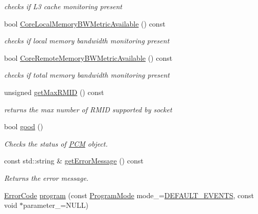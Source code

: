 \begin{DoxyCompactItemize}
\begin{DoxyCompactList}\small\item\em checks if L3 cache monitoring present \end{DoxyCompactList}\item 
bool \mbox{\hyperlink{class_p_c_m_af0648834f063a6bd2ea88c61a2ba286d}{Core\+Local\+Memory\+B\+W\+Metric\+Available}} () const
\begin{DoxyCompactList}\small\item\em checks if local memory bandwidth monitoring present \end{DoxyCompactList}\item 
bool \mbox{\hyperlink{class_p_c_m_a9b2b73d2af7c5a851e5c43df37d7fdb2}{Core\+Remote\+Memory\+B\+W\+Metric\+Available}} () const
\begin{DoxyCompactList}\small\item\em checks if total memory bandwidth monitoring present \end{DoxyCompactList}\item 
unsigned \mbox{\hyperlink{class_p_c_m_a0e1151b2a215849ab67ab2b0056e0e0f}{get\+Max\+R\+M\+ID}} () const
\begin{DoxyCompactList}\small\item\em returns the max number of R\+M\+ID supported by socket \end{DoxyCompactList}\item 
bool \mbox{\hyperlink{class_p_c_m_a56eedaa84893f72b1723f8d580ee3329}{good}} ()
\begin{DoxyCompactList}\small\item\em Checks the status of \mbox{\hyperlink{class_p_c_m}{P\+CM}} object. \end{DoxyCompactList}\item 
const std\+::string \& \mbox{\hyperlink{class_p_c_m_afbb527aac9b4a15b5437bbfc3111cdeb}{get\+Error\+Message}} () const
\begin{DoxyCompactList}\small\item\em Returns the error message. \end{DoxyCompactList}\item 
\mbox{\hyperlink{class_p_c_m_abebf5f22d794719dfc49155741e264e5}{Error\+Code}} \mbox{\hyperlink{class_p_c_m_abae9577a1a172c944d133bef10683825}{program}} (const \mbox{\hyperlink{class_p_c_m_a88584813a3ef51376efeb22928764786}{Program\+Mode}} mode\+\_\+=\mbox{\hyperlink{class_p_c_m_a88584813a3ef51376efeb22928764786a0e861144f482697cfa423b012ed42451}{D\+E\+F\+A\+U\+L\+T\+\_\+\+E\+V\+E\+N\+TS}}, const void $\ast$parameter\+\_\+=N\+U\+LL)

\end{DoxyCompactItemize}
